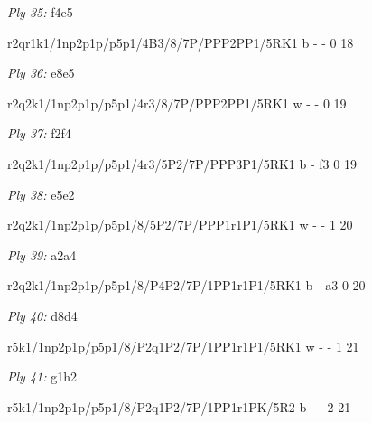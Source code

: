 \documentclass{article}
\begin{document}
\showboard

\bigskip

\emph{Ply 35:} f4e5


r2qr1k1/1np2p1p/p5p1/4B3/8/7P/PPP2PP1/5RK1 b - - 0 18


\showboard

\bigskip

\emph{Ply 36:} e8e5

r2q2k1/1np2p1p/p5p1/4r3/8/7P/PPP2PP1/5RK1 w - - 0 19


\showboard

\bigskip

\emph{Ply 37:} f2f4


r2q2k1/1np2p1p/p5p1/4r3/5P2/7P/PPP3P1/5RK1 b - f3 0 19


\showboard

\bigskip

\emph{Ply 38:} e5e2

r2q2k1/1np2p1p/p5p1/8/5P2/7P/PPP1r1P1/5RK1 w - - 1 20


\showboard

\bigskip

\emph{Ply 39:} a2a4


r2q2k1/1np2p1p/p5p1/8/P4P2/7P/1PP1r1P1/5RK1 b - a3 0 20


\showboard

\bigskip

\emph{Ply 40:} d8d4

r5k1/1np2p1p/p5p1/8/P2q1P2/7P/1PP1r1P1/5RK1 w - - 1 21


\showboard

\bigskip

\emph{Ply 41:} g1h2


r5k1/1np2p1p/p5p1/8/P2q1P2/7P/1PP1r1PK/5R2 b - - 2 21


\showboard
\end{document}
